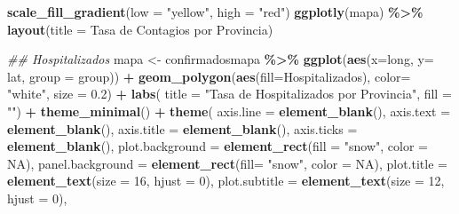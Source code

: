 \documentclass[
]{book}
\newenvironment{Shaded}{\begin{snugshade}}{\end{snugshade}}
\newcommand{\CommentTok}[1]{\textcolor[rgb]{0.56,0.35,0.01}{\textit{#1}}}
\newcommand{\DataTypeTok}[1]{\textcolor[rgb]{0.13,0.29,0.53}{#1}}
\newcommand{\DecValTok}[1]{\textcolor[rgb]{0.00,0.00,0.81}{#1}}
\newcommand{\FloatTok}[1]{\textcolor[rgb]{0.00,0.00,0.81}{#1}}
\newcommand{\KeywordTok}[1]{\textcolor[rgb]{0.13,0.29,0.53}{\textbf{#1}}}
\newcommand{\NormalTok}[1]{#1}
\newcommand{\OperatorTok}[1]{\textcolor[rgb]{0.81,0.36,0.00}{\textbf{#1}}}
\newcommand{\OtherTok}[1]{\textcolor[rgb]{0.56,0.35,0.01}{#1}}
\newcommand{\StringTok}[1]{\textcolor[rgb]{0.31,0.60,0.02}{#1}}
\begin{document}
\begin{Shaded}
\begin{Highlighting}[]
\StringTok{  }\KeywordTok{scale\_fill\_gradient}\NormalTok{(}\DataTypeTok{low =} \StringTok{"yellow"}\NormalTok{, }\DataTypeTok{high =} \StringTok{"red"}\NormalTok{)}
\KeywordTok{ggplotly}\NormalTok{(mapa) }\OperatorTok{\%\textgreater{}\%}\StringTok{  }
\StringTok{  }\KeywordTok{layout}\NormalTok{(}\DataTypeTok{title =} \StringTok{\textquotesingle{}Tasa de Contagios por Provincia\textquotesingle{}}\NormalTok{)}
\end{Highlighting}
\end{Shaded}

\hypertarget{htmlwidget-7aeae24ee6aa7dccd339}{}

\begin{Shaded}
\begin{Highlighting}[]
\CommentTok{\#\# Hospitalizados}
\NormalTok{mapa \textless{}{-}}\StringTok{ }\NormalTok{confirmadosmapa }\OperatorTok{\%\textgreater{}\%}
\StringTok{  }\KeywordTok{ggplot}\NormalTok{(}\KeywordTok{aes}\NormalTok{(}\DataTypeTok{x=}\NormalTok{long, }\DataTypeTok{y=}\NormalTok{ lat, }\DataTypeTok{group =}\NormalTok{ group)) }\OperatorTok{+}
\StringTok{  }\KeywordTok{geom\_polygon}\NormalTok{(}\KeywordTok{aes}\NormalTok{(}\DataTypeTok{fill=}\NormalTok{Hospitalizados), }\DataTypeTok{color=} \StringTok{"white"}\NormalTok{, }\DataTypeTok{size =} \FloatTok{0.2}\NormalTok{) }\OperatorTok{+}
\StringTok{  }\KeywordTok{labs}\NormalTok{( }\DataTypeTok{title =} \StringTok{"Tasa de Hospitalizados por Provincia"}\NormalTok{,}
        \DataTypeTok{fill =} \StringTok{""}\NormalTok{) }\OperatorTok{+}
\StringTok{  }\KeywordTok{theme\_minimal}\NormalTok{() }\OperatorTok{+}
\StringTok{  }\KeywordTok{theme}\NormalTok{(}
    \DataTypeTok{axis.line =} \KeywordTok{element\_blank}\NormalTok{(),}
    \DataTypeTok{axis.text =} \KeywordTok{element\_blank}\NormalTok{(),}
    \DataTypeTok{axis.title =} \KeywordTok{element\_blank}\NormalTok{(),}
    \DataTypeTok{axis.ticks =} \KeywordTok{element\_blank}\NormalTok{(),}
    \DataTypeTok{plot.background =} \KeywordTok{element\_rect}\NormalTok{(}\DataTypeTok{fill =} \StringTok{"snow"}\NormalTok{, }\DataTypeTok{color =} \OtherTok{NA}\NormalTok{),}
    \DataTypeTok{panel.background =} \KeywordTok{element\_rect}\NormalTok{(}\DataTypeTok{fill=} \StringTok{"snow"}\NormalTok{, }\DataTypeTok{color =} \OtherTok{NA}\NormalTok{),}
    \DataTypeTok{plot.title =} \KeywordTok{element\_text}\NormalTok{(}\DataTypeTok{size =} \DecValTok{16}\NormalTok{, }\DataTypeTok{hjust =} \DecValTok{0}\NormalTok{),}
    \DataTypeTok{plot.subtitle =} \KeywordTok{element\_text}\NormalTok{(}\DataTypeTok{size =} \DecValTok{12}\NormalTok{, }\DataTypeTok{hjust =} \DecValTok{0}\NormalTok{),}

\end{Highlighting}
\end{Shaded}
\end{document}
